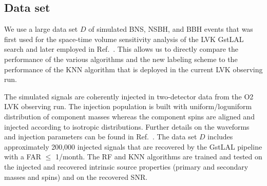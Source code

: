\subsection{Data set} \label{dataset}

We use a large data set $D$ of simulated \ac{BNS}, \ac{NSBH}, and \ac{BBH} events that was first used for the space-time volume sensitivity analysis of the \ac{LVK} GstLAL search
and later employed in Ref.~\cite{Chatterjee:2019avs}. This allows us to directly compare the performance of the various algorithms and the new labeling
scheme to the performance of the \ac{KNN} algorithm that is deployed in the current \ac{LVK} observing run. 

The simulated signals are coherently injected in two-detector data from the \ac{O2} \ac{LVK} observing run. The injection population is built with uniform/loguniform distribution of component masses whereas the component spins are aligned and injected according to isotropic distributions. Further details on the waveforms and injection parameters can be found in Ref.~\cite{Chatterjee:2019avs}. The data set $D$ includes approximately 200,000 injected signals that are recovered by the GstLAL pipeline with a \ac{FAR} $\le$ 1/month. The \ac{RF} and \ac{KNN} algorithms are trained and tested on the injected and recovered intrinsic source properties (primary and secondary masses and spins) and on the recovered \ac{SNR}. 

